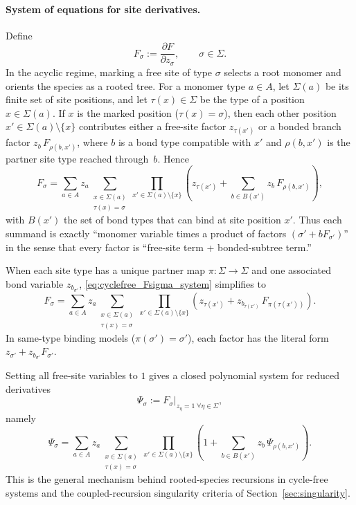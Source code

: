 \documentclass[11pt]{amsart}
\newcommand{\GFspecies}{F}
\newcommand{\PDeriv}[2]{\frac{\partial #1}{\partial #2}}
\theoremstyle{definition}
\theoremstyle{plain}
\theoremstyle{remark}
\begin{document}
\paragraph{System of equations for site derivatives.}
Define
\[
F_\sigma := \PDeriv{\GFspecies}{z_\sigma},\qquad \sigma\in\Sigma.
\]
In the acyclic regime, marking a free site of type $\sigma$ selects a root monomer and orients the species as a rooted tree.
For a monomer type $a\in A$, let $\Sigma(a)$ be its finite set of site positions, and let $\tau(x)\in\Sigma$ be the type of a position $x\in\Sigma(a)$.
If $x$ is the marked position ($\tau(x)=\sigma$), then each other position $x'\in\Sigma(a)\setminus\{x\}$ contributes either a free-site factor $z_{\tau(x')}$ or a bonded branch factor $z_b\,F_{\rho(b,x')}$, where $b$ is a bond type compatible with $x'$ and $\rho(b,x')$ is the partner site type reached through~$b$.
Hence
\begin{equation}\label{eq:cyclefree_Fsigma_system}
F_\sigma
=
\sum_{a\in A} z_a
\sum_{\substack{x\in\Sigma(a)\\ \tau(x)=\sigma}}
\prod_{x'\in\Sigma(a)\setminus\{x\}}
\left(
z_{\tau(x')}
+
\sum_{b\in B(x')} z_b\,F_{\rho(b,x')}
\right),
\end{equation}
with $B(x')$ the set of bond types that can bind at site position $x'$.
Thus each summand is exactly ``monomer variable times a product of factors $(\sigma'+bF_{\sigma'})$'' in the sense that every factor is ``free-site term + bonded-subtree term.''

When each site type has a unique partner map $\pi:\Sigma\to\Sigma$ and one associated bond variable $z_{b_{\sigma'}}$, \eqref{eq:cyclefree_Fsigma_system} simplifies to
\begin{equation}\label{eq:cyclefree_Fsigma_system_unique_partner}
F_\sigma
=
\sum_{a\in A} z_a
\sum_{\substack{x\in\Sigma(a)\\ \tau(x)=\sigma}}
\prod_{x'\in\Sigma(a)\setminus\{x\}}
\left(z_{\tau(x')} + z_{b_{\tau(x')}}\,F_{\pi(\tau(x'))}\right).
\end{equation}
In same-type binding models ($\pi(\sigma')=\sigma'$), each factor has the literal form $z_{\sigma'} + z_{b_{\sigma'}}F_{\sigma'}$.

Setting all free-site variables to $1$ gives a closed polynomial system for reduced derivatives
\[
\Psi_\sigma := F_\sigma\big|_{z_\eta=1\;\forall\eta\in\Sigma},
\]
namely
\begin{equation}\label{eq:cyclefree_Psi_system}
\Psi_\sigma
=
\sum_{a\in A} z_a
\sum_{\substack{x\in\Sigma(a)\\ \tau(x)=\sigma}}
\prod_{x'\in\Sigma(a)\setminus\{x\}}
\left(
1
+
\sum_{b\in B(x')} z_b\,\Psi_{\rho(b,x')}
\right).
\end{equation}
This is the general mechanism behind rooted-species recursions in cycle-free systems and the coupled-recursion singularity criteria of Section~\ref{sec:singularity}.
\end{document}
